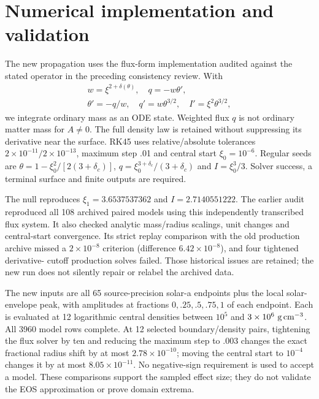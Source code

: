 \documentclass[twocolumn,prd,superscriptaddress,nofootinbib]{revtex4-2}
\begin{document}
\section{Numerical implementation and validation}
The new propagation uses the flux-form implementation audited against the
stated operator in the preceding consistency review. With
\begin{equation}
\begin{gathered}
w=\xi^{2+\delta(\theta)},\quad q=-w\theta',\\
\theta'=-q/w,\quad q'=w\theta^{3/2},\quad I'=\xi^2\theta^{3/2},
\end{gathered}
\end{equation}
we integrate ordinary mass as an ODE state. Weighted flux $q$ is not
ordinary matter mass for $A\ne0$. The full density law is retained without
suppressing its derivative near the surface. RK45 uses relative/absolute
tolerances $2\times10^{-11}/2\times10^{-13}$, maximum step .01 and
central start $\xi_0=10^{-6}$. Regular seeds are
$\theta=1-\xi_0^2/[2(3+\delta_c)]$,
$q=\xi_0^{3+\delta_c}/(3+\delta_c)$ and $I=\xi_0^3/3$.
Solver success, a terminal surface and finite outputs are required.

The null reproduces $\xi_1=3.6537537362$ and $I=2.7140551222$.
The earlier audit reproduced all 108 archived paired models using this
independently transcribed flux system. It also checked analytic mass/radius
scalings, unit changes and central-start convergence. Its strict replay
comparison with the old production archive missed a $2\times10^{-8}$
criterion (difference $6.42\times10^{-8}$), and four tightened derivative-
cutoff production solves failed. Those historical issues are retained;
the new run does not silently repair or relabel the archived data.

The new inputs are all 65 source-precision solar-a endpoints plus the local
solar-envelope peak, with amplitudes at fractions $0,.25,.5,.75,1$ of each
endpoint. Each is evaluated at 12 logarithmic central densities between
$10^5$ and $3\times10^6~{\rm g\,cm^{-3}}$. All 3960 model rows complete.
At 12 selected boundary/density pairs, tightening the flux solver by ten
and reducing the maximum step to .003 changes the exact fractional radius
shift by at most $2.78\times10^{-10}$; moving the central start to $10^{-4}$
changes it by at most $8.05\times10^{-11}$. No negative-sign requirement
is used to accept a model. These comparisons support the sampled effect
size; they do not validate the EOS approximation or prove domain extrema.
\end{document}
